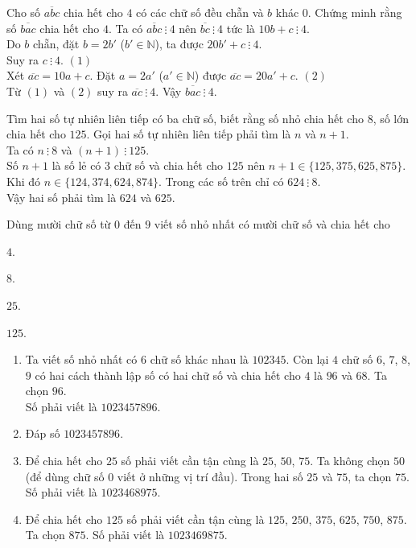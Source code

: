 \begin{bt}%
 Cho số $\overline{abc}$ chia hết cho $4$ có các chữ số đều chẵn và $b$ khác $0$. Chứng minh rằng số $\overline{bac}$ chia hết cho $4$.	
 \loigiai
  {
  Ta có $\overline{abc} \ \vdots \ 4$ nên  $\overline{bc} \ \vdots \ 4$	tức là $10b + c \ \vdots \ 4$.\\
  Do $b$ chẵn,  đặt $b=2b'$ ($b' \in \mathbb{N}$), ta được $20b'+c \ \vdots \ 4$.\\
  Suy ra $c \ \vdots \ 4$. \hfill $(1)$\\
  Xét $\overline{ac}=10a +c$. Đặt $a = 2a' $  ($a' \in \mathbb{N}$) được $\overline{ac}=20a' +c$. \hfill $(2)$\\
  Từ $(1)$ và $(2)$ suy ra $\overline{ac} \ \vdots \ 4$.
  Vậy $\overline{bac} \ \vdots \ 4 $.
  }
\end{bt}

\begin{bt}%
 Tìm hai số tự nhiên liên tiếp có ba chữ số, biết rằng số nhỏ chia hết cho $8$, số lớn chia hết cho $125$.		
 \loigiai
  {
  Gọi hai số tự nhiên liên tiếp phải tìm là $n$ và $n+1$.\\
  Ta có $n\ \vdots\ 8$ và $(n+1)\ \vdots\ 125$.\\
  Số $n+1$ là số lẻ có $3$ chữ số và chia hết cho $125$ nên $n+1 \in \{125,375,625,875 \}$.\\
  Khi đó $n \in \{124,374,624,874 \}$. Trong các số trên chỉ có $624\ \vdots\ 8$.\\
  Vậy hai số phải tìm là $624$ và $625$.
  }
\end{bt}

\begin{bt}%
 Dùng mười chữ số từ $0$ đến $9$ viết số nhỏ nhất có mười chữ số và chia hết cho
 \begin{enumEX}{4}
  \item $4$.
  \item $8$.
  \item $25$.
  \item $125$.
 \end{enumEX}
 \loigiai
  {
  \begin{enumerate}
   \item Ta viết số nhỏ nhất có $6$ chữ số khác nhau là $102345$. Còn lại $4$ chữ số $6$, $7$, $8$, $9$ có hai cách thành lập số có hai chữ số và chia hết cho $4$ là $96$ và $68$. Ta chọn $96$.\\
   Số phải viết là $1023457896$.
   \item Đáp số $1023457896$.
   \item Để chia hết cho $25$ số phải viết cần tận cùng là $25$, $50$, $75$. Ta không chọn $50$ (để dùng chữ số $0$ viết ở những vị trí đầu). Trong hai số $25$ và $75$, ta chọn $75$. Số phải viết là $1023468975$.
   \item Để chia hết cho $125$ số phải viết cần tận cùng là $125$, $250$, $375$, $625$, $750$, $875$. Ta chọn $875$. Số phải viết là $1023469875$.
  \end{enumerate}		
  }
\end{bt}

